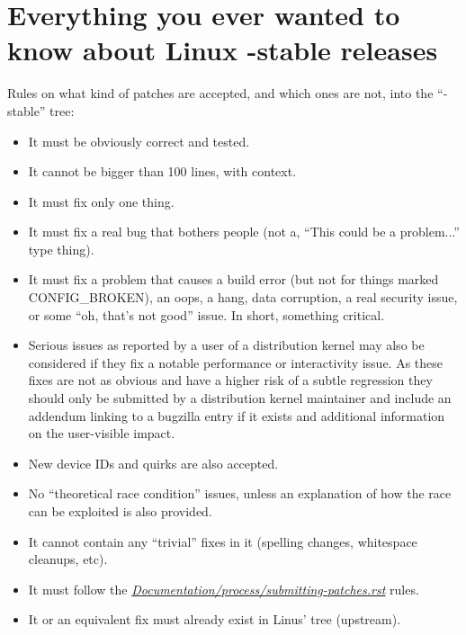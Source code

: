 \documentclass[a4paper,8pt,english]{sphinxmanual}
\begin{document}
\chapter{Everything you ever wanted to know about Linux -stable releases}
\label{process/stable-kernel-rules:everything-you-ever-wanted-to-know-about-linux-stable-releases}\label{process/stable-kernel-rules:stable-kernel-rules}\label{process/stable-kernel-rules::doc}
Rules on what kind of patches are accepted, and which ones are not, into the
``-stable'' tree:
\begin{itemize}
\item {} 
It must be obviously correct and tested.

\item {} 
It cannot be bigger than 100 lines, with context.

\item {} 
It must fix only one thing.

\item {} 
It must fix a real bug that bothers people (not a, ``This could be a
problem...'' type thing).

\item {} 
It must fix a problem that causes a build error (but not for things
marked CONFIG\_BROKEN), an oops, a hang, data corruption, a real
security issue, or some ``oh, that's not good'' issue.  In short, something
critical.

\item {} 
Serious issues as reported by a user of a distribution kernel may also
be considered if they fix a notable performance or interactivity issue.
As these fixes are not as obvious and have a higher risk of a subtle
regression they should only be submitted by a distribution kernel
maintainer and include an addendum linking to a bugzilla entry if it
exists and additional information on the user-visible impact.

\item {} 
New device IDs and quirks are also accepted.

\item {} 
No ``theoretical race condition'' issues, unless an explanation of how the
race can be exploited is also provided.

\item {} 
It cannot contain any ``trivial'' fixes in it (spelling changes,
whitespace cleanups, etc).

\item {} 
It must follow the
{\hyperref[process/submitting\string-patches:submittingpatches]{\emph{Documentation/process/submitting-patches.rst}}}
rules.

\item {} 
It or an equivalent fix must already exist in Linus' tree (upstream).

\end{itemize}
\end{document}
